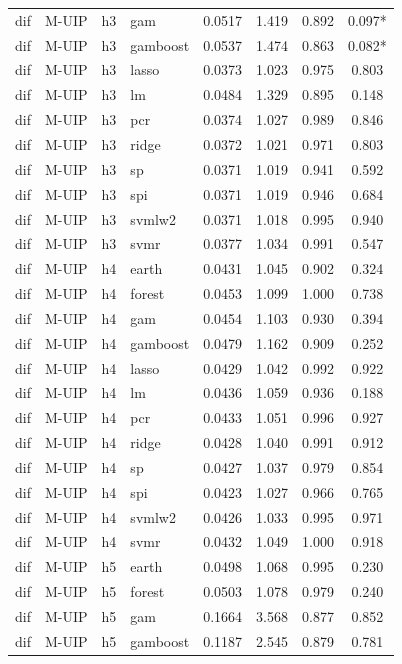 \begin{ThreePartTable}
\begin{longtable}[t]{llclcccc}
dif & M-UIP & h3 & gam & 0.0517 & 1.419 & 0.892 & 0.097*\\
dif & M-UIP & h3 & gamboost & 0.0537 & 1.474 & 0.863 & 0.082*\\
dif & M-UIP & h3 & lasso & 0.0373 & 1.023 & 0.975 & 0.803\\
dif & M-UIP & h3 & lm & 0.0484 & 1.329 & 0.895 & 0.148\\
dif & M-UIP & h3 & pcr & 0.0374 & 1.027 & 0.989 & 0.846\\
dif & M-UIP & h3 & ridge & 0.0372 & 1.021 & 0.971 & 0.803\\
dif & M-UIP & h3 & sp & 0.0371 & 1.019 & 0.941 & 0.592\\
dif & M-UIP & h3 & spi & 0.0371 & 1.019 & 0.946 & 0.684\\
dif & M-UIP & h3 & svmlw2 & 0.0371 & 1.018 & 0.995 & 0.940\\
dif & M-UIP & h3 & svmr & 0.0377 & 1.034 & 0.991 & 0.547\\
\addlinespace
dif & M-UIP & h4 & earth & 0.0431 & 1.045 & 0.902 & 0.324\\
dif & M-UIP & h4 & forest & 0.0453 & 1.099 & 1.000 & 0.738\\
dif & M-UIP & h4 & gam & 0.0454 & 1.103 & 0.930 & 0.394\\
dif & M-UIP & h4 & gamboost & 0.0479 & 1.162 & 0.909 & 0.252\\
dif & M-UIP & h4 & lasso & 0.0429 & 1.042 & 0.992 & 0.922\\
dif & M-UIP & h4 & lm & 0.0436 & 1.059 & 0.936 & 0.188\\
dif & M-UIP & h4 & pcr & 0.0433 & 1.051 & 0.996 & 0.927\\
dif & M-UIP & h4 & ridge & 0.0428 & 1.040 & 0.991 & 0.912\\
dif & M-UIP & h4 & sp & 0.0427 & 1.037 & 0.979 & 0.854\\
dif & M-UIP & h4 & spi & 0.0423 & 1.027 & 0.966 & 0.765\\
dif & M-UIP & h4 & svmlw2 & 0.0426 & 1.033 & 0.995 & 0.971\\
dif & M-UIP & h4 & svmr & 0.0432 & 1.049 & 1.000 & 0.918\\
\addlinespace
dif & M-UIP & h5 & earth & 0.0498 & 1.068 & 0.995 & 0.230\\
dif & M-UIP & h5 & forest & 0.0503 & 1.078 & 0.979 & 0.240\\
dif & M-UIP & h5 & gam & 0.1664 & 3.568 & 0.877 & 0.852\\
dif & M-UIP & h5 & gamboost & 0.1187 & 2.545 & 0.879 & 0.781\\

\end{longtable}
\end{ThreePartTable}
